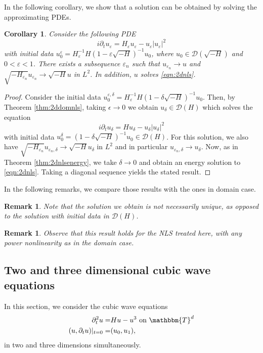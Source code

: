 \documentclass[11pt, oneside]{article}   	%
\newtheorem{corollary}[theorem]{Corollary}
\newtheorem{remark}[theorem]{Remark}
\begin{document}
In the following corollary, we show that a solution can be obtained by solving the approximating PDEs.
%
\begin{corollary}\label{corr:energyregconv}
	Consider the following PDE
	\[
	i \partial_tu_\varepsilon = H_\varepsilon u_\varepsilon - u_\varepsilon|u_\varepsilon|^2
	\]
	with initial data $u_0^\varepsilon = H_\varepsilon^{-1} H (1- \varepsilon \sqrt {- H})^{-1} u_0$, where $u_0 \in \mathscr{D} (\sqrt {- H})$ and $0 < \varepsilon <1$.  There exists a subsequence $\varepsilon_n$ such that $u_{\varepsilon_n} \to u$ and  $\sqrt{-H_{\varepsilon_n}}  u_{\varepsilon_n } \to \sqrt{-H}u$  in $L^2$.  In addition, $u$ solves \ref{eqn:2dnls}.
	\end{corollary}

\begin{proof}
Consider the initial data $u_0^{\varepsilon, \delta} = H_\varepsilon^{-1} H (1- \delta \sqrt {- H})^{-1} u_0$.  Then, by Theorem \ref{thm:2ddomnls},  taking $\epsilon \to 0$  we obtain $u_{\delta} \in \mathscr{D} (H)$ which solves  the equation
\[
i \partial_tu_{\delta} = H u_{\delta} - u_{\delta}|u_{\delta}|^2
\]
with initial data $u_0^{\delta} = (1- \delta \sqrt {- H})^{-1} u_0 \in \mathscr{D}(H)$.  For this solution, we also  have $\sqrt{-H_{\varepsilon_n}}  u_{\varepsilon_n, \delta } \to \sqrt{-H}u_\delta $  in $L^2$ and  in particular $u_{\varepsilon_n, \delta } \to u_\delta $.  Now, as in Theorem \ref{thm:2dnlsenergy}, we take $\delta \to 0$ and obtain an energy solution to   \eqref{eqn:2dnls}.  Taking a diagonal sequence yields the stated result.
\end{proof}

In the following remarks, we compare those results with the ones in domain case.
\begin{remark}\upshape\upshape
	Note that the solution we obtain is not necessarily unique, as opposed to the solution with initial data in $\mathscr{D}(H)$.
\end{remark}
\begin{remark}\upshape\upshape
Observe that this result holds for the NLS treated here, with any power nonlinearity as in the domain case.
\end{remark}

\subsection{Two and three dimensional cubic wave equations} \label{subsec:twothreewave}

In this section, we consider the cubic wave equations
\begin{align}
	\partial^2_t u  = & H u - u^3 \ \text{on} \  \mathbbm{T}^d \label{eqn:Hnlw}\\
	(u, \partial_t u) |_{t = 0}  = & (u_0, u_1),\nonumber
\end{align}
in two and three dimensions simultaneously.
\end{document}
